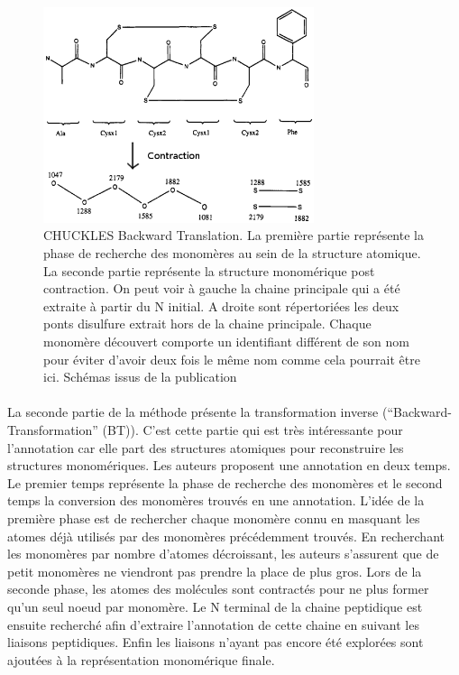 \documentclass[12pt,french,twoside]{report}
\begin{document}
\begin{figure}[!h]
  \begin{center}
    \includegraphics[width=300px]{Figures/s2m/formalisation/CHUCK_BT.png}
    \caption{\label{chuck_bt}CHUCKLES Backward Translation.
    La première partie représente la phase de recherche des monomères au sein de la structure atomique.
    La seconde partie représente la structure monomérique post contraction.
    On peut voir à gauche la chaine principale qui a été extraite à partir du N initial.
    A droite sont répertoriées les deux ponts disulfure extrait hors de la chaine principale.
    Chaque monomère découvert comporte un identifiant différent de son nom pour éviter d'avoir deux fois le même nom comme cela pourrait être ici.
    Schémas issus de la publication}
  \end{center}
\end{figure}

\paragraph{}La seconde partie de la méthode présente la transformation inverse (``Backward-Transformation'' (BT)).
C'est cette partie qui est très intéressante pour l'annotation car elle part des structures atomiques pour reconstruire les structures monomériques.
Les auteurs proposent une annotation en deux temps.
Le premier temps représente la phase de recherche des monomères et le second temps la conversion des monomères trouvés en une annotation.
L'idée de la première phase est de rechercher chaque monomère connu en masquant les atomes déjà utilisés par des monomères précédemment trouvés.
En recherchant les monomères par nombre d'atomes décroissant, les auteurs s'assurent que de petit monomères ne viendront pas prendre la place de plus gros.
Lors de la seconde phase, les atomes des molécules sont contractés pour ne plus former qu'un seul noeud par monomère.
Le N terminal de la chaine peptidique est ensuite recherché afin d'extraire l'annotation de cette chaine en suivant les liaisons peptidiques.
Enfin les liaisons n'ayant pas encore été explorées sont ajoutées à la représentation monomérique finale.
\end{document}
